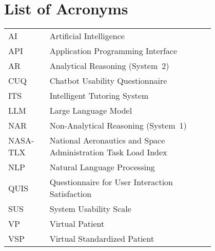 \chapter*{List of Acronyms}

\begin{flushleft}
\begin{tabular}{l p{0.8\linewidth}}
AI        & Artificial Intelligence \\
API       & Application Programming Interface \\
AR        & Analytical Reasoning (System~2) \\
CUQ       & Chatbot Usability Questionnaire \\
ITS       & Intelligent Tutoring System \\
LLM       & Large Language Model \\
NAR       & Non-Analytical Reasoning (System~1) \\
NASA-TLX  & National Aeronautics and Space Administration Task Load Index \\
NLP       & Natural Language Processing \\
QUIS      & Questionnaire for User Interaction Satisfaction \\
SUS       & System Usability Scale \\
VP        & Virtual Patient \\
VSP       & Virtual Standardized Patient \\
\end{tabular}
\end{flushleft}